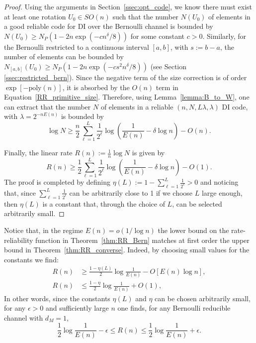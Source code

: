 \documentclass[10pt, conference]{IEEEtran}
\newcommand{\1}{\mathds{1}}
\begin{document}
\begin{proof}
Using the arguments in Section~\ref{ssec:opt_code}, we know there must exist at least one rotation $U_0\in SO(n)$ such that the number $N(U_0)$ of elements in a good reliable code for DI over the Bernoulli channel is bounded by $N(U_0)\geq N_P(1-2n\exp(-cn^\delta/8))$ for some constant $c>0$. Similarly, for the Bernoulli restricted to a continuous interval $[a,b]$, with $s:=b-a$, the number of elements can be bounded by $N_{[a,b]}(U_0)\geq N_P(1-2n\exp(-cs^2n^\delta/8))$ (see Section \ref{ssec:restricted_bern}). Since the negative term of the size correction is of order $\exp [-\text{poly}(n)]$, it is absorbed by the $O(n)$ term in Equation~\eqref{RR_primitive_size}. Therefore, using Lemma~\ref{lemma:B_to_W}, one can extract that the number $N$ of elements in a reliable $(n,N,L\lambda,\lambda)$ DI code, with $\lambda=2^{-nE(n)}$ is bounded by
\begin{equation}\label{RR_size}
\log N\geq\frac{n}{2}\sum_{\ell=1}^L\frac{1}{2^\ell}\log\left(\frac{1}{E(n)}-\delta\log n\right)-O(n).
\end{equation}

Finally, the linear rate $R(n):=\frac1n\log N$ is given by
\begin{equation}\label{RR_linear_rate}
R(n)\geq\frac{1}{2}\sum_{\ell=1}^L\frac{1}{2^\ell}\log\left(\frac{1}{E(n)}-\delta\log n\right)-O(1).
\end{equation}
The proof is completed by defining  $\eta(L):=1-\sum_{\ell=1}^L\frac{1}{2^\ell}>0$ and noticing that, since $\sum_{\ell=1}^L\frac{1}{2^\ell}$ can be arbitrarily close to 1 if we choose $L$ large enough, then $\eta(L)$ is a constant that, through the choice of $L$, can be selected arbitrarily small.  
\end{proof}

Notice that, in the regime $E(n)=o(1/\log n)$ the lower bound on the rate-reliability function in Theorem~\ref{thm:RR_Bern} matches at first order the upper bound in Theorem~\ref{thm:RR_converse}. Indeed, by choosing small values for the constants we find:
\begin{equation}
\begin{split}
R(n)&\geq\frac{1-\eta(L)}{2}\log\frac{1}{E(n)}-O[E(n)\log n],\\
R(n)&\leq\frac{1-\eta}{2}\log\frac{1}{E(n)}+O(1),
\end{split}
\end{equation}
In other words, since the constants $\eta(L)$ and $\eta$ can be chosen arbitrarily small, for any $\epsilon>0$ and sufficiently large $n$ one finds, for any Bernoulli reducible channel with $d_M=1$,
\begin{equation}
   \frac{1}{2}\log\frac{1}{E(n)}-\epsilon \leq R(n)\leq \frac{1}{2}\log\frac{1}{E(n)}+\epsilon.
\end{equation}
\end{document}
